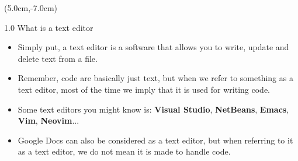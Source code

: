\documentclass [aspectratio=169]{beamer}
\title[]{\texorpdfstring{\vspace{60pt} \\ 
Functionalities, Performance, Pricings \\ 
Choosing the text editor of your choice}}
\begin{document}
\date{}

{
\begin{frame}
    \titlepage
    \begin{textblock*}{8cm}(5.0cm,-7.0cm)
        \huge {}
    \end{textblock*}
\end{frame}
}

{
\begin{frame}{1.0 What is a text editor}
    \begin{itemize}
        \item Simply put, a text editor is a software that allows you to write, update and delete text from a file.
        \item Remember, code are basically just text, but when we refer to something as a text editor, most of the time we imply that it is used for writing code.
        \item Some text editors you might know is: \textbf{Visual Studio}, \textbf{NetBeans}, \textbf{Emacs}, \textbf{Vim}, \textbf{Neovim}...
        \item Google Docs can also be considered as a text editor, but when referring to it as a text editor, we do not mean it is made to handle code.
    \end{itemize}
\end{frame}
}
\end{document}
